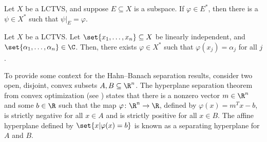 \begin{theorem}\label{thm:hb_continuous_extension_lctvs}
  Let $X$ be a LCTVS, and suppose $E\subseteq X$ is a subspace. If $\varphi\in E^{\ast}$, then there is a $\psi\in X^{\ast}$ such that $\psi|_{E} = \varphi$.
\end{theorem}
\begin{corollary}
  Let $X$ be a LCTVS. Let $\set{x_1,\dots,x_n}\subseteq X$ be linearly independent, and $\set{\alpha_1,\dots,\alpha_n}\in \C$. Then, there exists $\varphi\in X^{\ast}$ such that $\varphi\left(x_j\right) = \alpha_j$ for all $j$.
\end{corollary}
To provide some context for the Hahn--Banach separation results, consider two open, disjoint, convex subsets $A,B\subseteq \R^n$. The hyperplane separation theorem from convex optimization (see \cite[Chapter 2.6]{convex_optimization}) states that there is a nonzero vector $m\in \R^n$ and some $b\in \R$ such that the map $\varphi\colon \R^n\rightarrow \R$, defined by $\varphi(x) = m^{T}x - b$, is strictly negative for all $x\in A$ and is strictly positive for all $x\in B$. The affine hyperplane defined by $\set{x | \varphi(x) = b}$ is known as a separating hyperplane for $A$ and $B$.\newline

